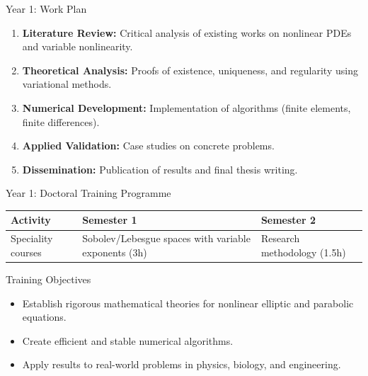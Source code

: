 \documentclass[11pt]{beamer}
\begin{document}
	\begin{frame}{Year 1: Work Plan}
		\begin{enumerate}
			\item \textbf{Literature Review:} Critical analysis of existing works on nonlinear PDEs and variable nonlinearity.
			\item \textbf{Theoretical Analysis:} Proofs of existence, uniqueness, and regularity using variational methods.
			\item \textbf{Numerical Development:} Implementation of algorithms (finite elements, finite differences).
			\item \textbf{Applied Validation:} Case studies on concrete problems.
			\item \textbf{Dissemination:} Publication of results and final thesis writing.
		\end{enumerate}
	\end{frame}
	
	\begin{frame}{Year 1: Doctoral Training Programme}
		\begin{table}[h!]
			\centering
			\renewcommand{\arraystretch}{1.3}
			\small
			\begin{tabular}{@{}p{} p{0.36\textwidth} p{}@{}}
				\toprule
				\textbf{Activity} & \textbf{Semester 1} & \textbf{Semester 2} \\
				\midrule
				Speciality courses &
				Sobolev/Lebesgue spaces with variable exponents (3h) &
				Research methodology (1.5h) \\
				\bottomrule
			\end{tabular}
		\end{table}
		
		\vspace{0.3cm}
		
		\begin{block}{Training Objectives}
			\begin{itemize}
				\item Establish rigorous mathematical theories for nonlinear elliptic and parabolic equations.
				\item Create efficient and stable numerical algorithms.
				\item Apply results to real-world problems in physics, biology, and engineering.
			\end{itemize}
		\end{block}
	\end{frame}
	
\end{document}
